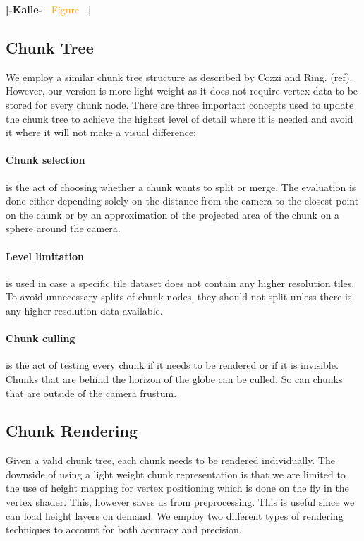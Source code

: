 \documentclass[journal]{vgtc}                %
\newcommand{\kallecomment}[1]{\textbf{[-Kalle-~}
    \textcolor{orange}{#1}
    \textbf{~]}}
\begin{document}
\kallecomment{Figure}

\subsection{Chunk Tree}

We employ a similar chunk tree structure as described by Cozzi and Ring. (ref).
However, our version is more light weight as it does not require vertex data to be stored for every chunk node.
There are three important concepts used to update the chunk tree to achieve the highest level of detail where it is needed and avoid it where it will not make a visual difference:

\paragraph{Chunk selection} is the act of choosing whether a chunk wants to split or merge.
The evaluation is done either depending solely on the distance from the camera to the closest point on the chunk or by an approximation of the projected area of the chunk on a sphere around the camera.

\paragraph{Level limitation} is used in case a specific tile dataset does not contain any higher resolution tiles.
 To avoid unnecessary splits of chunk nodes, they should not split unless there is any higher resolution data available.

\paragraph{Chunk culling} is the act of testing every chunk if it needs to be rendered or if it is invisible.
Chunks that are behind the horizon of the globe can be culled.
So can chunks that are outside of the camera frustum.

\subsection{Chunk Rendering}

Given a valid chunk tree, each chunk needs to be rendered individually.
The downside of using a light weight chunk representation is that we are limited to the use of height mapping for vertex positioning which is done on the fly in the vertex shader.
This, however saves us from preprocessing.
This is useful since we can load height layers on demand.
We employ two different types of rendering techniques to account for both accuracy and precision.
\end{document}
